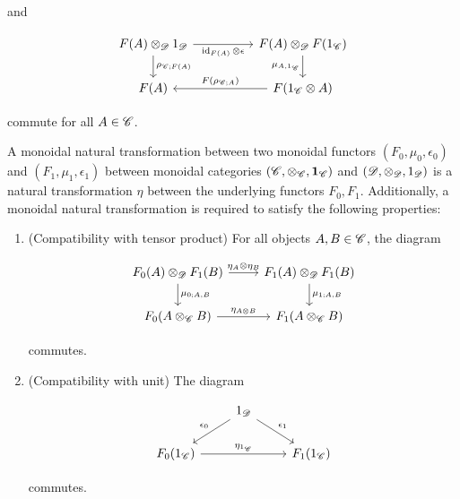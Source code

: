 \begin{definition}
\begin{enumerate}
and

\[\begin{tikzcd}
	{F(A)\otimes_{\Dcat}1_{\Dcat}} && {F(A)\otimes_{\Dcat}F(1_{\C})} \\
	{F(A)} && {F(1_{\C}\otimes A)}
	\arrow["{\rho_{\C;F(A)}}", from=1-1, to=2-1]
	\arrow["{F(\rho_{\C;A})}"', from=2-3, to=2-1]
	\arrow["{\mu_{A,1_{\C}}}"', from=1-3, to=2-3]
	\arrow["{\id_{F(A)}\otimes\epsilon}"', from=1-1, to=1-3]
\end{tikzcd}\]

commute for all $A\in \mathscr{C}$.
\end{enumerate}

\raggedleft\qedsymbol{}
\end{definition}


\begin{definition} A monoidal natural transformation between two monoidal functors $(F_0,\mu_0,\epsilon_0)$ and $(F_1,\mu_1,\epsilon_1)$ between monoidal categories $(\mathscr{C},\otimes_{\mathscr{C}},\mathbf{1}_{\mathscr{C}})$ and $(\mathscr{D},\otimes_{\mathscr{D}},1_{\mathscr{D}})$ is a natural transformation $\eta$ between the underlying functors $F_0,F_1$. Additionally, a monoidal natural transformation is required to satisfy the following properties:

\begin{enumerate}
\item (Compatibility with tensor product) For all objects $A,B\in \mathscr{C}$, the diagram

\[\begin{tikzcd}
	{F_0(A)\otimes_{\Dcat}F_1(B)} & {F_1(A)\otimes_{\Dcat}F_1(B)} \\
	{F_0(A\otimes_{\C} B)} & {F_1(A\otimes_{\C} B)}
	\arrow["{\mu_{0;A,B}}", from=1-1, to=2-1]
	\arrow["{\mu_{1;A,B}}", from=1-2, to=2-2]
	\arrow["{\eta_A\otimes \eta_B}", from=1-1, to=1-2]
	\arrow["{\eta_{A\otimes B}}", from=2-1, to=2-2]
\end{tikzcd}\]

commutes.

\item (Compatibility with unit) The diagram

\[\begin{tikzcd}
	& {1_{\Dcat}} \\
	{F_0(1_{\C})} && {F_1(1_{\C})}
	\arrow["{\eta_{1_{\C}}}", from=2-1, to=2-3]
	\arrow["{\epsilon_0}"', from=1-2, to=2-1]
	\arrow["{\epsilon_1}", from=1-2, to=2-3]
\end{tikzcd}\]

commutes.
\end{enumerate}
\raggedleft\qedsymbol{}
\end{definition}

